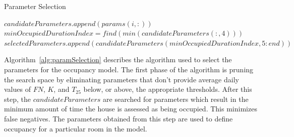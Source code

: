 \begin{algorithm}                      %
\caption{Parameter Selection}          %
\label{alg:paramSelection}                           %
\begin{algorithmic}                    %
\STATE $candidateParameters.append(params(i, :))$
\ENDIF 
\ENDFOR
\STATE $minOccupiedDurationIndex = find(min(candidateParameters(:, 4)))$
\STATE $selectedParameters.append(candidateParameters(minOccupiedDurationIndex, 5:end))$
\end{algorithmic}
\end{algorithm}

Algorithm~\ref{alg:paramSelection} describes the algorithm used to select the
parameters for the occupancy model. The first phase of the algorithm is pruning
the search space by eliminating parameters that don't provide average daily
values of $FN$, $K$, and $T_{25}$ below, or above, the appropriate
thresholds. After this step, the $candidateParameters$ are searched for
parameters which result in the minimum amount of time the house is assessed as
being occupied. This minimizes false negatives. The parameters obtained from
this step are used to define occupancy for a particular room in the model.

\begin{figure}[t]
\end{figure}

